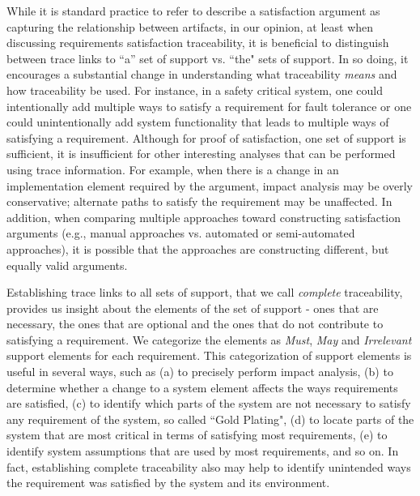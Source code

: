 
While it is standard practice to refer to describe a satisfaction argument as capturing the relationship between artifacts, in our opinion, at least when discussing requirements satisfaction traceability, it is beneficial to distinguish between trace links to ``a'' set of support vs. ``the" sets of support. In so doing, it encourages a substantial change in understanding what traceability {\em means} and how traceability be used. For instance, in a safety critical system, one could intentionally add multiple ways to satisfy a requirement for fault tolerance or one could unintentionally add system functionality that leads to multiple ways of satisfying a requirement. Although for proof of satisfaction, one set of support is sufficient, it is insufficient for other interesting analyses that can be performed using trace information. For example, when there is a change in an implementation element required by the argument, impact analysis may be overly conservative; alternate paths to satisfy the requirement may be unaffected.  In addition, when comparing multiple approaches toward constructing satisfaction arguments (e.g., manual approaches vs. automated or semi-automated approaches), it is possible that the approaches are constructing different, but equally valid arguments.  


Establishing trace links to all sets of support, that we call \emph{complete} traceability, provides us insight about the elements of the set of support - ones that are necessary, the ones that are optional and the ones that do not contribute to satisfying a requirement.  We categorize the elements as \emph{Must}, \emph{May} and \emph{Irrelevant} support elements for each requirement.  This categorization of support elements is useful in several ways, such as (a) to precisely perform impact analysis, (b) to determine whether a change to a system element affects the ways requirements are satisfied,  (c) to identify which parts of the system are not necessary to satisfy any requirement of the system, so called ``Gold Plating", (d) to locate parts of the system that are most critical in terms of satisfying most requirements, (e) to identify system assumptions that are used by most requirements, and so on. In fact, establishing complete traceability also may help to identify unintended ways the requirement was satisfied by the system and its environment.

